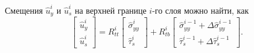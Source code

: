 Смещения $\hat{u}^{i}_{y}$ и $\hat{u}^{i}_{s}$ на верхней границе $i$-го слоя можно найти, как
\begin{equation}
    \begin{bmatrix}
        \hat{u}^{i}_{y} \\
        \hat{u}^{i}_{s}
    \end{bmatrix}
    =
    R_{tt}^{i}
    \begin{bmatrix}
        \hat{\sigma}^{i}_{yy} \\
        \hat{\tau}^{i}_{s}
    \end{bmatrix}
    +
    R_{tb}^{i}
    \begin{bmatrix}
        \hat{\sigma}^{i-1}_{yy} + \Delta\hat{\sigma}^{i-1}_{yy} \\
        \hat{\tau}^{i-1}_{s} + \Delta\hat{\tau}^{i-1}_{s}
    \end{bmatrix}.
\end{equation}
